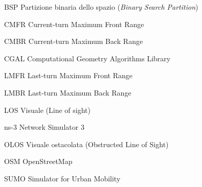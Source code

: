 \begin{abbreviations}

\item[BSP] Partizione binaria dello spazio (\textit{Binary Search Partition})
\item[CMFR] Current-turn Maximum Front Range
\item[CMBR] Current-turn Maximum Back Range
\item[CGAL] Computational Geometry Algorithms Library
\item[LMFR] Last-turn Maximum Front Range
\item[LMBR] Last-turn Maximum Back Range
\item[LOS] Visuale (Line of sight)
\item[ns-3] Network Simulator 3
\item[OLOS] Visuale ostacolata (Obstructed Line of Sight)
\item[OSM] OpenStreetMap
\item[SUMO] Simulator for Urban Mobility

\end{abbreviations}
